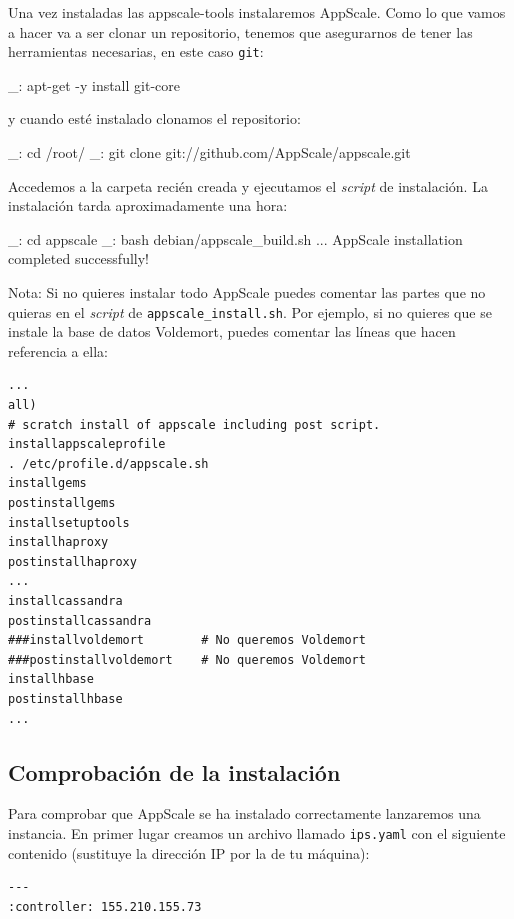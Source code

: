 Una vez instaladas las appscale-tools instalaremos AppScale. Como lo que vamos a hacer va a ser clonar un repositorio, tenemos que asegurarnos de tener las herramientas necesarias, en este caso \texttt{git}:

\begin{bashcode}
_: apt-get -y install git-core
\end{bashcode}

y cuando esté instalado clonamos el repositorio:

\begin{bashcode}
_: cd /root/
_: git clone git://github.com/AppScale/appscale.git
\end{bashcode}

Accedemos a la carpeta recién creada y ejecutamos el \emph{script} de instalación. La instalación tarda aproximadamente una hora:

\begin{bashcode}
_: cd appscale
_: bash debian/appscale_build.sh
...
AppScale installation completed successfully!
\end{bashcode}

Nota: Si no quieres instalar todo AppScale puedes comentar las partes que no quieras en el \emph{script} de \texttt{appscale\_install.sh}. Por ejemplo, si no quieres que se instale la base de datos Voldemort, puedes comentar las líneas que hacen referencia a ella:

\begin{lstlisting}
...
all)
# scratch install of appscale including post script.
installappscaleprofile
. /etc/profile.d/appscale.sh
installgems
postinstallgems
installsetuptools
installhaproxy
postinstallhaproxy
...
installcassandra
postinstallcassandra
###installvoldemort        # No queremos Voldemort
###postinstallvoldemort    # No queremos Voldemort
installhbase
postinstallhbase
...
\end{lstlisting}


\subsection{Comprobación de la instalación}

Para comprobar que AppScale se ha instalado correctamente lanzaremos una instancia. En primer lugar creamos un archivo llamado \texttt{ips.yaml} con el siguiente contenido (sustituye la dirección IP por la de tu máquina):

\begin{lstlisting}
--- 
:controller: 155.210.155.73
\end{lstlisting}

